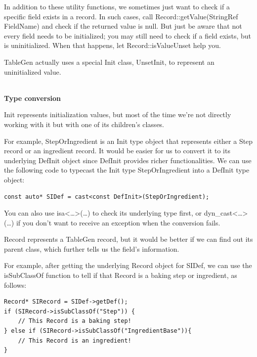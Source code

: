 In addition to these utility functions, we sometimes just want to check if a specific field exists in a record. In such cases, call Record::getValue(StringRef FieldName) and check if the returned value is null. But just be aware that not every field needs to be initialized; you may still need to check if a field exists, but is uninitialized. When that happens, let Record::isValueUnset help you.

\begin{tcolorbox}[colback=blue!5!white,colframe=blue!75!black, fonttitle=\bfseries,title=Note]
\hspace*{0.7cm}TableGen actually uses a special Init class, UnsetInit, to represent an uninitialized value.
\end{tcolorbox}

\hspace*{\fill} \\ %
\noindent
\textbf{Type conversion}

Init represents initialization values, but most of the time we're not directly working with it but with one of its children's classes.

For example, StepOrIngredient is an Init type object that represents either a Step record or an ingredient record. It would be easier for us to convert it to its underlying DefInit object since DefInit provides richer functionalities. We can use the following code to typecast the Init type StepOrIngredient into a DefInit type object:

\begin{lstlisting}[style=styleCXX]
const auto* SIDef = cast<const DefInit>(StepOrIngredient);
\end{lstlisting}

You can also use isa<…>(…) to check its underlying type first, or dyn\_cast<…>(…) if you don't want to receive an exception when the conversion fails.

Record represents a TableGen record, but it would be better if we can find out its parent class, which further tells us the field's information.

For example, after getting the underlying Record object for SIDef, we can use the isSubClassOf function to tell if that Record is a baking step or ingredient, as follows:

\begin{lstlisting}[style=styleCXX]
Record* SIRecord = SIDef->getDef();
if (SIRecord->isSubClassOf("Step")) {
	// This Record is a baking step!
} else if (SIRecord->isSubClassOf("IngredientBase")){
	// This Record is an ingredient!
}
\end{lstlisting}

